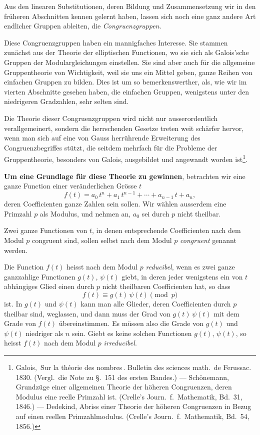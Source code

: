\documentclass[12pt,a4paper]{article}
\begin{document}
Aus den linearen Substitutionen, deren Bildung und Zusammensetzung wir in den früheren Abschnitten kennen gelernt haben, lassen sich noch eine ganz andere Art endlicher Gruppen ableiten, die \emph{Congruenzgruppen}.

Diese Congruenzgruppen haben ein mannigfaches Interesse. Sie stammen zunächst aus der Theorie der elliptischen Functionen, wo sie sich als Galois'sche Gruppen der Modulargleichungen einstellen. Sie sind aber auch für die allgemeine Gruppentheorie von Wichtigkeit, weil sie uns ein Mittel geben, ganze Reihen von einfachen Gruppen zu bilden. Dies ist um so bemerkenswerther, als, wie wir im vierten Abschnitte gesehen haben, die einfachen Gruppen, wenigstens unter den niedrigeren Gradzahlen, sehr selten sind.

Die Theorie dieser Congruenzgruppen wird nicht nur ausserordentlich verallgemeinert, sondern die herrschenden Gesetze treten weit schärfer hervor, wenn man sich auf eine von Gauss herrührende Erweiterung des Congruenzbegriffes stützt, die seitdem mehrfach für die Probleme der Gruppentheorie, besonders von Galois, ausgebildet und angewandt worden ist\footnote{Galois, \,Sur la théorie des nombres\,. Bulletin des sciences math.\ de Ferussac. 1830. (Vergl.\ die Note zu \S.~151 des ersten Bandes.) --- Schönemann, Grundzüge einer allgemeinen Theorie der höheren Congruenzen, deren Modulus eine reelle Primzahl ist. (Crelle's Journ.\ f.\ Mathematik, Bd.~31, 1846.) --- Dedekind, Abriss einer Theorie der höheren Congruenzen in Bezug auf einen reellen Primzahlmodulus. (Crelle's Journ.\ f.\ Mathematik, Bd.~54, 1856.)}.

\medskip\noindent\textbf{Um eine Grundlage für diese Theorie zu gewinnen}, betrachten wir eine ganze Function einer veränderlichen Grösse $t$
\begin{equation}\label{eq:63.1}
\tag{1}
f(t) = a_{0}\,t^{n} + a_{1}\,t^{n-1} + \cdots + a_{n-1}\,t + a_{n},
\end{equation}
deren Coefficienten ganze Zahlen sein sollen. Wir wählen ausserdem eine Primzahl $p$ als Modulus, und nehmen an, $a_{0}$ sei durch $p$ nicht theilbar.

Zwei ganze Functionen von $t$, in denen entsprechende Coefficienten nach dem Modul $p$ congruent sind, sollen selbst nach dem Modul $p$ \emph{congruent} genannt werden.

Die Function $f(t)$ heisst nach dem Modul $p$ \emph{reducibel}, wenn es zwei ganze ganzzahlige Functionen $g(t)$, $\psi(t)$ giebt, in deren jeder wenigstens ein von $t$ abhängiges Glied einen durch $p$ nicht theilbaren Coefficienten hat, so dass
\begin{equation}\label{eq:63.2}
\tag{2}
f(t) \equiv g(t)\,\psi(t) \pmod{p}
\end{equation}
ist. In $g(t)$ und $\psi(t)$ kann man alle Glieder, deren Coefficienten durch $p$ theilbar sind, weglassen, und dann muss der Grad von $g(t)\,\psi(t)$ mit dem Grade von $f(t)$ übereinstimmen. Es müssen also die Grade von $g(t)$ und $\psi(t)$ niedriger als $n$ sein. Giebt es keine solchen Functionen $g(t)$, $\psi(t)$, so heisst $f(t)$ nach dem Modul $p$ \emph{irreducibel}.
\end{document}
